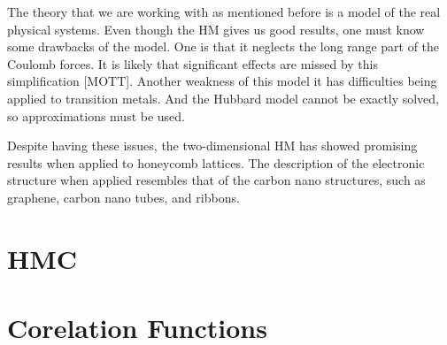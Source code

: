 The theory that we are working with as mentioned before is a model of the real physical systems. Even though the HM gives us good results, one must know some drawbacks of the model. One is that it neglects the long range part of the Coulomb forces. It is likely that significant effects are missed by this simplification [MOTT]. Another weakness of this model it has difficulties being applied to transition metals. And the Hubbard model cannot be exactly solved, so approximations must be used.

Despite having these issues, the two-dimensional HM has showed promising results when applied to honeycomb lattices. The description of the electronic structure when applied resembles that of the carbon nano structures, such as graphene, carbon nano tubes, and ribbons.


\section{HMC}



\section{Corelation Functions}
\label{sec:corr_func}

